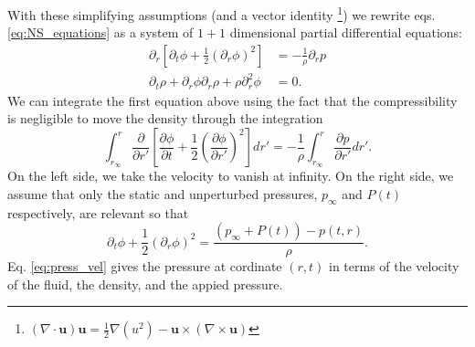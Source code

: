 \documentclass[rmp,aps,nofootinbib,superscriptaddress,floatfix]{revtex4-2}
\begin{document}
With these simplifying assumptions (and a vector identity \footnote{$\left( \nabla \cdot \bm{u} \right) \bm{u} = \frac{1}{2} \nabla (u^2) - \bm{u}\times \left( \nabla \times \bm{u} \right)$}) we rewrite eqs. \ref{eq:NS_equations} as a system of $1+1$ dimensional partial differential equations: 
\begin{equation}
\begin{split}
     \partial_r \left[ \partial_t \phi +\frac{1}{2} \left( \partial_r \phi \right)^2 \right] & = - \frac{1}{\rho} \partial_r p  \\ 
     \partial_t \rho+ \partial_r \phi \partial_r \rho + \rho \partial^2_r \phi & = 0.
     \label{eq:NS_1D}
\end{split}
\end{equation}
We can integrate the first equation above using the fact that the compressibility is negligible to move the density through the integration \cite{leighton2007derivation}
\begin{equation}
    \int_{r_\infty}^{r} \frac{\partial}{\partial r'} \left[ \frac{\partial \phi}{\partial t} +\frac{1}{2} \left( \frac{\partial \phi}{\partial r'} \right)^2 \right] dr' = - \frac{1}{\rho} \int_{r_\infty}^{r} \frac{\partial p}{\partial r'} dr'.
\end{equation}
On the left side, we take the velocity to vanish at infinity. On the right side, we assume that only the static and unperturbed pressures, $p_\infty$ and $P(t)$ respectively, are relevant so that \cite{prosperetti1999old,prosperetti1986bubble,leighton2007derivation} 
\begin{equation}
    \partial_t \phi + \frac{1}{2}\left( \partial_r \phi \right)^2 = \frac{(p_\infty+P(t))-p(t,r)}{\rho}.
    \label{eq:press_vel}
\end{equation}
Eq. \ref{eq:press_vel} gives the pressure at cordinate $(r,t)$ in terms of the velocity of the fluid, the density, and the appied pressure. 
\end{document}
